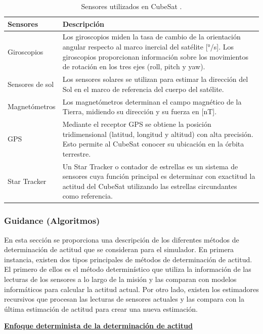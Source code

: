 \begin{table}[h!]
	\centering
	\caption{Sensores utilizados en CubeSat \cite{ref6}.}
	\begin{tabular}{|l|p{10cm}|}
		\hline
		\textbf{Sensores} & \textbf{Descripción} \\ \hline
		Giroscopios & Los giroscopios miden la tasa de cambio de la orientación angular respecto al marco inercial del satélite [°/s]. Los giroscopios proporcionan información sobre los movimientos de rotación en los tres ejes (roll, pitch y yaw). \\ \hline
		Sensores de sol & Los sensores solares se utilizan para estimar la dirección del Sol en el marco de referencia del cuerpo del satélite. \\ \hline
		Magnetómetros & Los magnetómetros determinan el campo magnético de la Tierra, midiendo su dirección y su fuerza en [nT]. \\ \hline
		\gls{GPS} & Mediante el receptor \gls{GPS} se obtiene la posición tridimensional (latitud, longitud y altitud) con alta precisión. Esto permite al CubeSat conocer su ubicación en la órbita terrestre. \\ \hline
		Star Tracker & Un Star Tracker o contador de estrellas es un sistema de sensores cuya función principal es determinar con exactitud la actitud del CubeSat utilizando las estrellas circundantes como referencia. \\ \hline
	\end{tabular}
	\label{tab:sensores}
\end{table}

\subsubsection{Guidance (Algoritmos)}

En esta sección se proporciona una descripción de los diferentes métodos de determinación de actitud que se consideran para el simulador. En primera instancia, existen dos tipos principales de métodos de determinación de actitud. El primero de ellos es el método determinístico que utiliza la información de las lecturas de los sensores a lo largo de la misión y las comparan con modelos informáticos para calcular la actitud actual\cite{ref15}. Por otro lado, existen los estimadores recursivos que procesan las lecturas de sensores actuales y las compara con la última estimación de actitud para crear una nueva estimación.

\textbf{\underline{Enfoque determinista de la determinación de actitud}}

